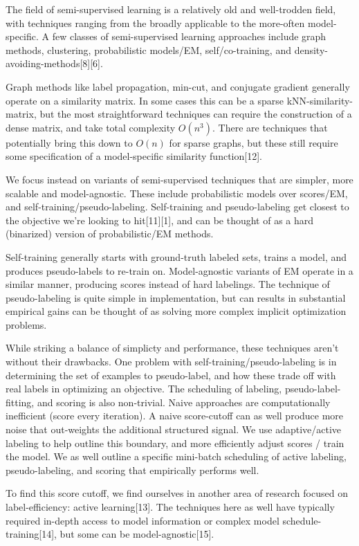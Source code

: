 \documentclass{article}
\begin{document}
The field of semi-supervised learning is a relatively old and well-trodden field, with techniques ranging from the broadly applicable to the more-often model-specific.  A few classes of semi-supervised learning approaches include graph methods, clustering, probabilistic models/EM, self/co-training, and density-avoiding-methods[8][6].  

Graph methods like label propagation, min-cut, and conjugate gradient generally operate on a similarity matrix.  In some cases this can be a sparse kNN-similarity-matrix, but the most straightforward techniques can require the construction of a dense matrix, and take total complexity $O(n^3)$.  There are techniques that potentially bring this down to $O(n)$ for sparse graphs, but these still require some specification of a model-specific similarity function[12].  

We focus instead on variants of semi-supervised techniques that are simpler, more scalable and model-agnostic.  These include probabilistic models over scores/EM, and self-training/pseudo-labeling.  Self-training and pseudo-labeling get closest to the objective we're looking to hit[11][1], and can be thought of as a hard (binarized) version of probabilistic/EM methods.  

Self-training generally starts with ground-truth labeled sets, trains a model, and produces pseudo-labels to re-train on.  Model-agnostic variants of EM operate in a similar manner, producing scores instead of hard labelings.  The technique of pseudo-labeling is quite simple in implementation, but can results in substantial empirical gains can be thought of as solving more complex implicit optimization problems.

While striking a balance of simplicty and performance, these techniques aren't without their drawbacks.  One problem with self-training/pseudo-labeling is in determining the set of examples to pseudo-label, and how these trade off with real labels in optimizing an objective.  The scheduling of labeling, pseudo-label-fitting, and scoring is also non-trivial.  Naive approaches are computationally inefficient (score every iteration).  A naive score-cutoff can as well produce more noise that out-weights the additional structured signal.  We use adaptive/active labeling to help outline this boundary, and more efficiently adjust scores / train the model.  We as well outline a specific mini-batch scheduling of active labeling, pseudo-labeling, and scoring that empirically performs well.   

To find this score cutoff, we find ourselves in another area of research focused on label-efficiency: active learning[13].  The techniques here as well have typically required in-depth access to model information or complex model schedule-training[14], but some can be model-agnostic[15].   
\end{document}
